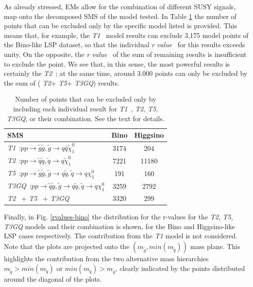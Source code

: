 \documentclass[a4paper,11pt]{article}
\newcommand{\RVALUE}{\textit{r value}}
\newcommand{\TGQ}{ \textit{T3GQ}}
\newcommand{\Tone}{ \textit{T1}}
\newcommand{\Ttwo}{ \textit{T2}}
\newcommand{\Tfive}{ \textit{T5}}
\begin{document}
%

As already stressed, EMs allow for the combination of different SUSY signals, map onto the decomposed SMS of the model tested. In Table \ref{breakdown_number} the number of points that can be excluded only by the specific model listed is provided. This means that, for example, the \Tone~ model results can exclude 3,175 model points of the Bino-like LSP dataset, so that the individual \RVALUE~ for this results exceeds unity. On the opposite, the \RVALUE~ of the sum of remaining results is insufficient to exclude the point. We see that, in this sense, the most powerful results is certainly the \Ttwo~; at the same time, around 3.000 points can only be excluded by the sum of (\Ttwo+\Tfive+\TGQ) results.
\begin{table}[!h]
	\footnotesize
	\begin{center}
		\renewcommand{\arraystretch}{1.3}
		\begin{tabular}{ l c c }  \toprule \toprule
			\textbf{SMS} & \textbf{Bino} & \textbf{Higgsino} \\  \toprule
			\Tone~:$p p \rightarrow \tilde g \tilde g , \tilde g \rightarrow q \bar q \tilde \chi_1 ^0$ & 3174 & 204   \\
			\Ttwo~:$p p \rightarrow \tilde q \tilde q , \tilde q \rightarrow q \tilde \chi_1 ^0$ & 7221 & 11180 \\
			\Tfive~:$p p \rightarrow \tilde g \tilde g , \tilde g \rightarrow q \tilde q , \tilde q  \rightarrow q \chi_1 ^0$ & 191 & 160  \\
			\TGQ~:$p p \rightarrow \tilde q \tilde g , \tilde g \rightarrow q \tilde q , \tilde q  \rightarrow q \chi_1 ^0$ & 3259 & 2792  \\
			\Ttwo~ +\Tfive~ +\TGQ~ & 3320 & 299 \\
			\bottomrule \bottomrule 
		\end{tabular}
	\end{center}
	\caption{Number of points that can be excluded only by including each individual result for \Tone~,\Ttwo,\Tfive,\TGQ, or their combination. See the text for details.}
	\label{breakdown_number} 
\end{table}
Finally, in Fig. \ref{rvalues-bino} the distribution for the r-values for the \textit{T2}, \textit{T5}, \textit{T3GQ} models and their combination is shown, for the Bino and Higgsino-like LSP cases respectively. The contribution from the \textit{T1} model is not considered. Note that the plots are projected onto the $(m_{\tilde g}, min(m_{\tilde q}))$ mass plane. This highlights the contribution from the two alternative mass hierarchies $m_{\tilde g} > min(m_{\tilde q})$ or $min(m_{\tilde q}) > m_{\tilde g} $, clearly indicated by the points distributed around the diagonal of the plots. 
\end{document}
